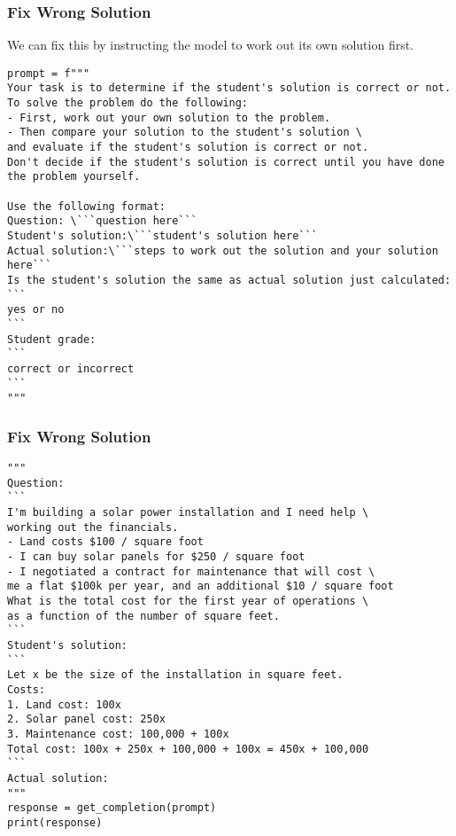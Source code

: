 \begin{frame}[fragile]\frametitle{Fix Wrong Solution}

We can fix this by instructing the model to work out its own solution first.

{\tiny
\begin{lstlisting}
prompt = f"""
Your task is to determine if the student's solution is correct or not.
To solve the problem do the following:
- First, work out your own solution to the problem. 
- Then compare your solution to the student's solution \ 
and evaluate if the student's solution is correct or not. 
Don't decide if the student's solution is correct until you have done the problem yourself.

Use the following format:
Question: \```question here```
Student's solution:\```student's solution here```
Actual solution:\```steps to work out the solution and your solution here```
Is the student's solution the same as actual solution just calculated:
```
yes or no
```
Student grade:
```
correct or incorrect
```
"""
\end{lstlisting}
}
\end{frame}


\begin{frame}[fragile]\frametitle{Fix Wrong Solution}


{\tiny
\begin{lstlisting}
"""
Question:
```
I'm building a solar power installation and I need help \
working out the financials. 
- Land costs $100 / square foot
- I can buy solar panels for $250 / square foot
- I negotiated a contract for maintenance that will cost \
me a flat $100k per year, and an additional $10 / square foot
What is the total cost for the first year of operations \
as a function of the number of square feet.
``` 
Student's solution:
```
Let x be the size of the installation in square feet.
Costs:
1. Land cost: 100x
2. Solar panel cost: 250x
3. Maintenance cost: 100,000 + 100x
Total cost: 100x + 250x + 100,000 + 100x = 450x + 100,000
```
Actual solution:
"""
response = get_completion(prompt)
print(response)
\end{lstlisting}
}
\end{frame}